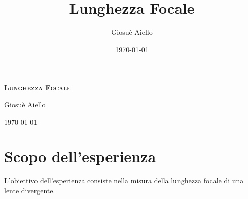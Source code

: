 \documentclass{article}
\title{Lunghezza Focale}
\author{Giosuè Aiello}
\date{\today}
\begin{document}
	\begin{titlingpage}
    \begin{center}
        \vspace*{60pt} %

        {\Huge \textbf{\textsc{Lunghezza Focale}}} %
        \vspace{30pt} %

        {\huge{Giosuè Aiello}} %
        \vspace{20pt} %

        {\large \today} %
    \end{center}
    
    \vfill %
\end{titlingpage}

\pagebreak
\section{Scopo dell'esperienza}
L’obiettivo dell’esperienza consiste nella misura della lunghezza focale di una lente divergente.

\end{document}
